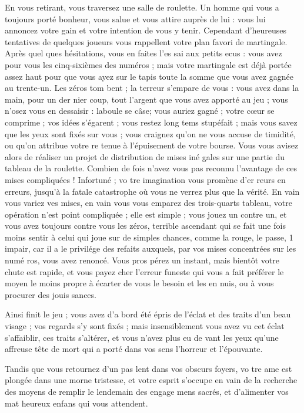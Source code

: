 En vous retirant, vous traversez
une salle de roulette. Un homme qui
vous a toujours porté bonheur, vous
salue et vous attire auprès de lui :
vous lui annoncez votre gain et votre
intention de vous y tenir. Cependant
d'heureuses tentatives de quelques
joueurs vous rappellent votre plan
favori de martingale. Après quel%
ques hésitations, vous en faites l'es%
sai aux petits ecus : vous avez pour
vous les cinq-sixièmes des numéros ;
mais votre martingale est déjà portée
assez haut pour que vous ayez sur
le tapis toute la somme que vous avez
gagnée au trente-un. Les zéros tom%
bent ; la terreur s'empare de vous :
vous avez dans la main, pour un der
nier coup, tout l'argent que vous avez
apporté au jeu ; vous n'osez vous en
dessaisir : laboule se câse; vous auriez
gagné ; votre cœur se comprime ;
vos idées s'égarent ; vous restez long%
tems stupéfait ; mais vous savez que
les yeux sont fixés sur vous ; vous
craignez qu'on ne vous accuse de
timidité, ou qu'on attribue votre re%
tenue à l'épuisement de votre bourse.
Vous vous avisez alors de réaliser un
projet de distribution de mises iné%
gales sur une partie du tableau de
la roulette. Combien de fois n'avez%
vous pas reconnu l'avantage de ces
mises compliquées ! Infortuné ; vo%
tre imagination vous promène d'er%
reurs en erreurs, jusqu'à la fatale
catastrophe où vous ne verrez plus
que la vérité. En vain vous variez ves
mises, en vain vous vous emparez
des trois-quarts tableau, votre
opération n'est point compliquée ;
elle est simple ; vous jouez un contre
un, et vous avez toujours contre vous
les zéros, terrible ascendant qui se
fait une fois moins sentir à celui qui
joue sur de simples chances, comme
la rouge, le passe, 1 impair, car il a
le privilége des refaits auxquels, par
vos mises concentrées sur les numé%
ros, vous avez renoncé. Vous pros%
pérez un instant, mais bientôt votre
chute est rapide, et vous payez
cher l'erreur funeste qui vous a fait
préférer le moyen le moins propre
à écarter de vous le besoin et les en%
nuis, ou à vous procurer des jouis%
sances.

Ainsi finit le jeu ; vous avez d'a%
bord été épris de l'éclat et des traits
d'un beau visage ; vos regards s'y
sont fixés ; mais insensiblement vous
avez vu cet éclat s'affaiblir, ces traits
s'altérer, et vous n'avez plus eu de%
vant les yeux qu'une affreuse tête
de mort qui a porté dans vos sens
l'horreur et l'épouvante.

Tandis que vous retournez d'un
pas lent dans vos obscurs foyers, vo%
tre ame est plongée dans une morne
tristesse, et votre esprit s'occupe en
vain de la recherche des moyens de
remplir le lendemain des engage%
mens sacrés, et d'alimenter vos mat%
heureux enfans qui vous attendent.

